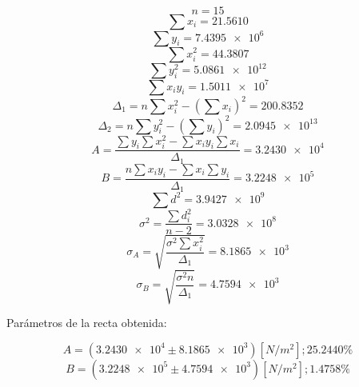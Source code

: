 \documentclass[letter,11pt]{article}
\begin{document}
\begin{equation*}
    n = 15
\end{equation*}
\begin{equation*}
    \sum x_i = 21.5610
\end{equation*}
\begin{equation*}
    \sum y_i = \num{7.4395e6}
\end{equation*}
\begin{equation*}
    \sum x^2_i = 44.3807
\end{equation*}
\begin{equation*}
    \sum y^2_i = \num{5.0861e12}
\end{equation*}
\begin{equation*}
    \sum x_i y_i = \num{1.5011e7}
\end{equation*}
\begin{equation*}
    \Delta_1 = n \sum x^2_i - \left( \sum x_i \right)^2 = 200.8352
\end{equation*}
\begin{equation*}
    \Delta_2 = n \sum y^2_i - \left( \sum y_i \right)^2 = \num{2.0945e13}
\end{equation*}
\begin{equation*}
    A = \frac{\sum y_i \sum x^2_i - \sum x_i y_i \sum x_i}{\Delta_1}
      = \num{3.2430e4}
\end{equation*}
\begin{equation*}
    B = \frac{n \sum x_i y_i - \sum x_i \sum y_i}{\Delta_1} = \num{3.2248e5}
\end{equation*}
\begin{equation*}
    \sum d^2 = \num{3.9427e9}
\end{equation*}
\begin{equation*}
    \sigma^2 = \frac{\sum d^2_i}{n-2} = \num{3.0328e8}
\end{equation*}
\begin{equation*}
    \sigma_A = \sqrt{\frac{\sigma^2 \sum x^2_i}{\Delta_1}} = \num{8.1865e3}
\end{equation*}
\begin{equation*}
    \sigma_B = \sqrt{\frac{\sigma^2 n}{\Delta_1}} = \num{4.7594e3}
\end{equation*}
\vspace{0.10cm}

Parámetros de la recta obtenida:

\begin{equation*}
    A = (\num{3.2430e4} \pm \num{8.1865e3}) [N/m^2]; 25.2440\%
\end{equation*}
\begin{equation*}
    B = (\num{3.2248e5} \pm \num{4.7594e3}) [N/m^2]; 1.4758\%
\end{equation*}
\vspace{0.10cm}
\end{document}
